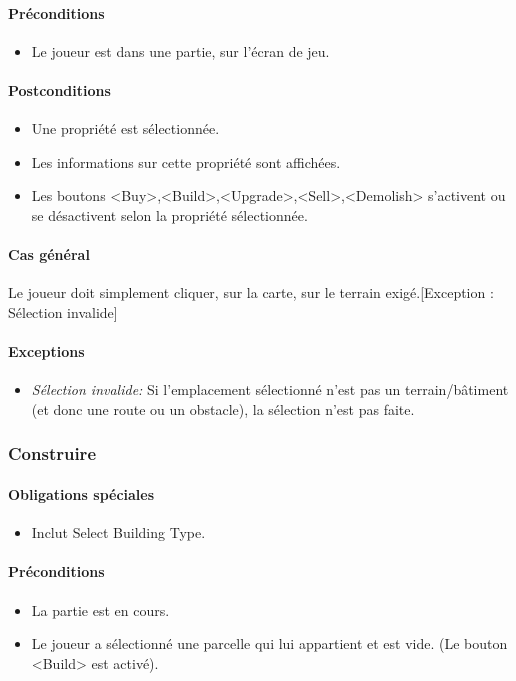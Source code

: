\documentclass[a4paper,11pt]{report}
\begin{document}
\paragraph{Préconditions}
\begin{itemize}
	\item Le joueur est dans une partie, sur l'écran de jeu.
\end{itemize}
\paragraph{Postconditions}
\begin{itemize}
	\item Une propriété est sélectionnée.
	\item Les informations sur cette propriété sont affichées.
	\item Les boutons <Buy>,<Build>,<Upgrade>,<Sell>,<Demolish> s'activent ou se désactivent selon la propriété sélectionnée.
\end{itemize}
\paragraph{Cas général}
Le joueur doit simplement cliquer, sur la carte, sur le terrain exigé.[Exception : Sélection invalide]
\paragraph{Exceptions}
\begin{itemize}
	\item \textit{Sélection invalide:} Si l'emplacement sélectionné n'est pas un terrain/bâtiment (et donc une route ou un obstacle), la sélection n'est pas faite.
\end{itemize}

\subsubsection{Construire}
\paragraph{Obligations spéciales}
\begin{itemize}
 \item Inclut Select Building Type.
\end{itemize}
\paragraph{Préconditions}
\begin{itemize}
 \item La partie est en cours.
 \item Le joueur a sélectionné une parcelle qui lui appartient et est vide. (Le bouton <Build> est activé).
\end{itemize}
\end{document}
